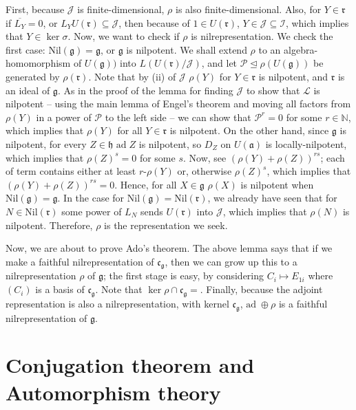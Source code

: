 \documentclass{article}
\newcommand{\NaN}{\mathbb{N}}
\newcommand{\lie}[1]{\mathfrak{#1}}
\newcommand{\ad}[1]{\mathrm{ad}\; #1}
\newcommand{\Nil}[1]{\mathrm{Nil}(#1)}
\begin{document}
First, because $\mathcal{J}$ is finite-dimensional, $\rho$ is also finite-dimensional.
Also, for $Y \in \lie{r}$ if $\overline{L_Y} = 0$, or $L_Y U(\lie{r}) \subseteq \mathcal{J}$, then because of $1 \in U(\lie{r})$, $Y \in \mathcal{J} \subseteq \mathcal{I}$, which implies that $Y \in \ker{\sigma}$.
Now, we want to check if $\rho$ is nilrepresentation.
We check the first case: $\Nil{\lie{g}} = \lie{g}$, or $\lie{g}$ is nilpotent.
We shall extend $\rho$ to an algebra-homomorphism of $U(\lie{g}))$ into $L(U(\lie{r}) / \mathcal{J})$, and let $\mathcal{P} \trianglelefteq \rho(U(\lie{g}))$ be generated by $\rho(\lie{r})$.
Note that by (ii) of $\mathcal{J}$ $\rho(Y)$ for $Y \in \lie{r}$ is nilpotent, and $\lie{r}$ is an ideal of $\lie{g}$.
As in the proof of the lemma for finding $\mathcal{J}$ to show that $\mathcal{L}$ is nilpotent -- using the main lemma of Engel's theorem and moving all factors from $\rho(Y)$ in a power of $\mathcal{P}$ to the left side -- we can show that $\mathcal{P}^r = 0$ for some $r \in \NaN$, which implies that $\rho(Y)$ for all $Y \in \lie{r}$ is nilpotent.
On the other hand, since $\lie{g}$ is nilpotent, for every $Z \in \lie{h}$ $\ad{Z}$ is nilpotent, so $D_Z$ on $U(\lie{a})$ is locally-nilpotent, which implies that $\rho(Z)^s = 0$ for some $s$.
Now, see $(\rho(Y) + \rho(Z))^{rs}$; each of term contains either at least $r$-$\rho(Y)$ or, otherwise $\rho(Z)^s$, which implies that $(\rho(Y) + \rho(Z))^{rs} = 0$.
Hence, for all $X \in \lie{g}$ $\rho(X)$ is nilpotent when $\Nil{\lie{g}} = \lie{g}$.
In the case for $\Nil{\lie{g}} = \Nil{\lie{r}}$, we already have seen that for $N \in \Nil{\lie{r}}$ some power of $L_N$ sends $U(\lie{r})$ into $\mathcal{J}$, which implies that $\rho(N)$ is nilpotent.
Therefore, $\rho$ is the representation we seek.

Now, we are about to prove Ado's theorem.
The above lemma says that if we make a faithful nilrepresentation of $\lie{c}_\lie{g}$, then we can grow up this to a nilrepresentation $\rho$ of $\lie{g}$; the first stage is easy, by considering $C_i \mapsto E_{1i}$ where $(C_i)$ is a basis of $\lie{c}_\lie{g}$.
Note that $\ker{\rho} \cap \lie{c}_\lie{g} = $.
Finally, because the adjoint representation is also a nilrepresentation, with kernel $\lie{c}_\lie{g}$, $\ad \oplus \rho$ is a faithful nilrepresentation of $\lie{g}$.

\newpage

\part{Conjugation theorem and Automorphism theory}
\end{document}
